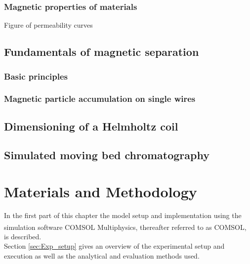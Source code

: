 \subsection{Magnetic properties of materials}
\label{subsec:Mag_mat}
Figure of permeability curves

\section{Fundamentals of magnetic separation}
\label{sec:Mag_sep}

\subsection{Basic principles}
\label{subsec:bas_princ}

\subsection{Magnetic particle accumulation on single wires}
\label{subsec:single_wire}

\section{Dimensioning of a Helmholtz coil}
\label{sec:Dim_helm_coil}

\section{Simulated moving bed chromatography}
\label{sec:smb}

\chapter{Materials and Methodology}
\label{chap:chap_mat}

In the first part of this chapter the model setup and implementation using the simulation software COMSOL Multiphysics\textsuperscript{\textregistered}, thereafter referred to as COMSOL, is described.\\
Section \ref{sec:Exp_setup} gives an overview of the experimental setup and execution as well as the analytical and evaluation methods used.  


